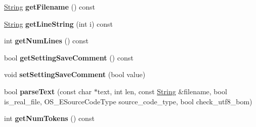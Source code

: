 \begin{DoxyCompactItemize}
\item 
\hyperlink{class_object_script_1_1_o_s_1_1_core_1_1_string}{String} {\bfseries get\+Filename} () const \hypertarget{class_object_script_1_1_o_s_1_1_core_1_1_tokenizer_a641711da5dc5b8a9462207f3db9ffcdb}{}\label{class_object_script_1_1_o_s_1_1_core_1_1_tokenizer_a641711da5dc5b8a9462207f3db9ffcdb}

\item 
\hyperlink{class_object_script_1_1_o_s_1_1_core_1_1_string}{String} {\bfseries get\+Line\+String} (int i) const \hypertarget{class_object_script_1_1_o_s_1_1_core_1_1_tokenizer_a65eab8f0c0c33db6f12fdab061b6cb57}{}\label{class_object_script_1_1_o_s_1_1_core_1_1_tokenizer_a65eab8f0c0c33db6f12fdab061b6cb57}

\item 
int {\bfseries get\+Num\+Lines} () const \hypertarget{class_object_script_1_1_o_s_1_1_core_1_1_tokenizer_a5b26a8697d45d4d1a21d09e0970a81c6}{}\label{class_object_script_1_1_o_s_1_1_core_1_1_tokenizer_a5b26a8697d45d4d1a21d09e0970a81c6}

\item 
bool {\bfseries get\+Setting\+Save\+Comment} () const \hypertarget{class_object_script_1_1_o_s_1_1_core_1_1_tokenizer_a51fa37e77bf38138edfa8fcd5e0f3e4b}{}\label{class_object_script_1_1_o_s_1_1_core_1_1_tokenizer_a51fa37e77bf38138edfa8fcd5e0f3e4b}

\item 
void {\bfseries set\+Setting\+Save\+Comment} (bool value)\hypertarget{class_object_script_1_1_o_s_1_1_core_1_1_tokenizer_a991b0a7b642c13b491669d944ceaec9e}{}\label{class_object_script_1_1_o_s_1_1_core_1_1_tokenizer_a991b0a7b642c13b491669d944ceaec9e}

\item 
bool {\bfseries parse\+Text} (const char $\ast$text, int len, const \hyperlink{class_object_script_1_1_o_s_1_1_core_1_1_string}{String} \&filename, bool is\+\_\+real\+\_\+file, O\+S\+\_\+\+E\+Source\+Code\+Type source\+\_\+code\+\_\+type, bool check\+\_\+utf8\+\_\+bom)\hypertarget{class_object_script_1_1_o_s_1_1_core_1_1_tokenizer_ac7a041e3d6f2346dab7fcd0767dbbf71}{}\label{class_object_script_1_1_o_s_1_1_core_1_1_tokenizer_ac7a041e3d6f2346dab7fcd0767dbbf71}

\item 
int {\bfseries get\+Num\+Tokens} () const \hypertarget{class_object_script_1_1_o_s_1_1_core_1_1_tokenizer_a6b67a15d1e3f2f2979209895b7548744}{}\label{class_object_script_1_1_o_s_1_1_core_1_1_tokenizer_a6b67a15d1e3f2f2979209895b7548744}


\end{DoxyCompactItemize}
